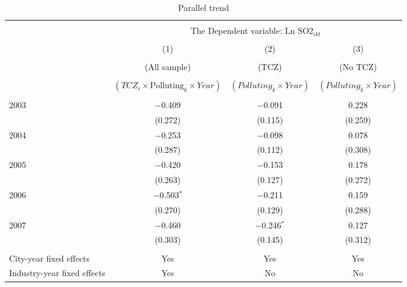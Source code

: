 \documentclass[12pt]{article}
\begin{document}
\begin{table}[!htb] \centering
  \caption{Parallel trend}
  \begin{adjustbox}{width=\textwidth, totalheight=\baselineskip,keepaspectratio}
    \label{tab:table4}
    \begin{tabular}{@{\extracolsep{5pt}}lccc}
      \\[-1.8ex]\hline
      \hline \\[-1.8ex]
      & \multicolumn{3}{c}{The Dependent variable: $\text{Ln SO2}_{ikt}$} \\
      \cline{2-4}
      \\[-1.8ex] & (1) & (2) & (3)\\
      \\[-1.8ex] & (All sample) & (TCZ) & (No TCZ)\\
      \\[-1.8ex] & $(TCZ_i \times \text{Polluting}_k \times Year)$ & $(Polluting_k \times Year)$ & $(Polluting_k \times Year)$\\
      \hline \\[-1.8ex]
      2003                        & $-$0.409       & $-$0.091       & 0.228   \\
                                  & (0.272)        & (0.115)        & (0.259) \\
      2004                        & $-$0.253       & $-$0.098       & 0.078   \\
                                  & (0.287)        & (0.112)        & (0.308) \\
      2005                        & $-$0.420       & $-$0.153       & 0.178   \\
                                  & (0.263)        & (0.127)        & (0.272) \\
      2006                        & $-$0.503$^{*}$ & $-$0.211       & 0.159   \\
                                  & (0.270)        & (0.129)        & (0.288) \\
      2007                        & $-$0.460       & $-$0.246$^{*}$ & 0.127   \\
                                  & (0.303)        & (0.145)        & (0.312) \\
      \hline \\[-1.8ex]
      City-year fixed effects     & Yes            & Yes            & Yes     \\
      Industry-year fixed effects & Yes            & No             & No      \\

\end{tabular}
\end{adjustbox}
\end{table}
\end{document}
